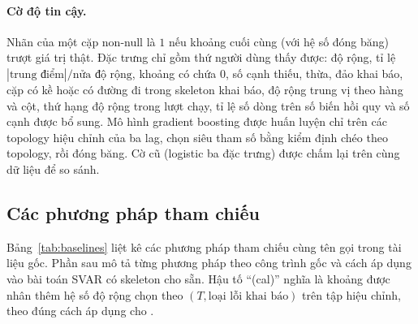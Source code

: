 \paragraph{Cờ độ tin cậy.} Nhãn của một cặp non-null là $1$ nếu khoảng cuối cùng (với hệ số đóng băng) trượt giá trị thật. Đặc trưng chỉ gồm thứ người dùng thấy được: độ rộng, tỉ lệ $|\text{trung điểm}|/\text{nửa độ rộng}$, khoảng có chứa $0$, số cạnh thiếu, thừa, đảo khai báo, cặp có kề hoặc có đường đi trong skeleton khai báo, độ rộng trung vị theo hàng và cột, thứ hạng độ rộng trong lượt chạy, tỉ lệ số dòng trên số biến hồi quy và số cạnh được bổ sung. Mô hình gradient boosting được huấn luyện chỉ trên các topology hiệu chỉnh của ba lag, chọn siêu tham số bằng kiểm định chéo theo topology, rồi đóng băng. Cờ cũ (logistic ba đặc trưng) được chấm lại trên cùng dữ liệu để so sánh.

\subsection{Các phương pháp tham chiếu}\label{sec:baseline}
Bảng~\ref{tab:baselines} liệt kê các phương pháp tham chiếu cùng tên gọi trong tài liệu gốc. Phần sau mô tả từng phương pháp theo công trình gốc và cách áp dụng vào bài toán SVAR có skeleton cho sẵn. Hậu tố ``(cal)'' nghĩa là khoảng được nhân thêm hệ số độ rộng chọn theo $(T,\text{loại lỗi khai báo})$ trên tập hiệu chỉnh, theo đúng cách áp dụng cho \ours{}.

